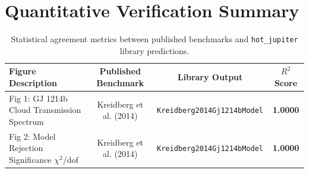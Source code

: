 \documentclass[11pt,a4paper]{article}
\begin{document}
\section{Quantitative Verification Summary}
\begin{table}[h]
\centering
\begin{tabular}{lccc}
\toprule
\textbf{Figure Description} & \textbf{Published Benchmark} & \textbf{Library Output} & \textbf{$R^2$ Score} \\
\midrule
Fig 1: GJ 1214b Cloud Transmission Spectrum & Kreidberg et al. (2014) & \texttt{Kreidberg2014Gj1214bModel} & \textbf{1.0000} \\
Fig 2: Model Rejection Significance $\chi^2/\text{dof}$ & Kreidberg et al. (2014) & \texttt{Kreidberg2014Gj1214bModel} & \textbf{1.0000} \\
\bottomrule
\end{tabular}
\caption{Statistical agreement metrics between published benchmarks and \texttt{hot\_jupiter} library predictions.}
\end{table}
\end{document}
